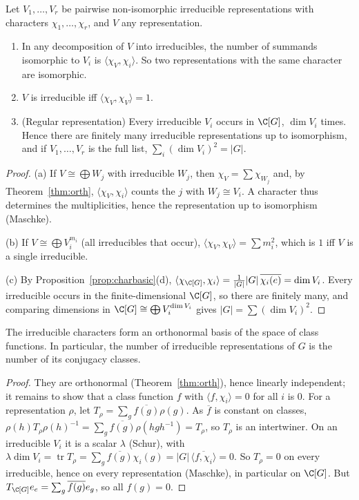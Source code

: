 \begin{corollary}\label{cor:mult}
Let $V_1,\dots,V_r$ be pairwise non-isomorphic irreducible representations with characters $\chi_1,\dots,\chi_r$, and $V$ any representation.
\begin{enumerate}[label=(\alph*)]
\item In any decomposition of $V$ into irreducibles, the number of summands isomorphic to $V_i$ is $\langle\chi_V,\chi_i\rangle$. So two representations with the same character are isomorphic.
\item $V$ is irreducible iff $\langle\chi_V,\chi_V\rangle=1$.
\item (Regular representation) Every irreducible $V_i$ occurs in $\C[G]$, $\dim V_i$ times. Hence there are finitely many irreducible representations up to isomorphism, and if $V_1,\dots,V_r$ is the full list, $\sum_i(\dim V_i)^2=|G|$.
\end{enumerate}
\end{corollary}
\begin{proof}
(a) If $V\cong\bigoplus W_j$ with irreducible $W_j$, then $\chi_V=\sum\chi_{W_j}$ and, by Theorem~\ref{thm:orth}, $\langle\chi_V,\chi_i\rangle$ counts the $j$ with $W_j\cong V_i$. A character thus determines the multiplicities, hence the representation up to isomorphism (Maschke).

(b) If $V\cong\bigoplus V_i^{m_i}$ (all irreducibles that occur), $\langle\chi_V,\chi_V\rangle=\sum m_i^2$, which is $1$ iff $V$ is a single irreducible.

(c) By Proposition~\ref{prop:charbasic}(d), $\langle\chi_{\C[G]},\chi_i\rangle=\frac1{|G|}|G|\,\overline{\chi_i(e)}=\dim V_i$. Every irreducible occurs in the finite-dimensional $\C[G]$, so there are finitely many, and comparing dimensions in $\C[G]\cong\bigoplus V_i^{\dim V_i}$ gives $|G|=\sum(\dim V_i)^2$.
\end{proof}

\begin{theorem}\label{thm:classes}
The irreducible characters form an orthonormal basis of the space of class functions. In particular, the number of irreducible representations of $G$ is the number of its conjugacy classes.
\end{theorem}
\begin{proof}
They are orthonormal (Theorem~\ref{thm:orth}), hence linearly independent; it remains to show that a class function $f$ with $\langle f,\chi_i\rangle=0$ for all $i$ is $0$. For a representation $\rho$, let $T_\rho=\sum_g\overline{f(g)}\rho(g)$. As $\overline f$ is constant on classes, $\rho(h)T_\rho\rho(h)^{-1}=\sum_g\overline{f(g)}\rho(hgh^{-1})=T_\rho$, so $T_\rho$ is an intertwiner. On an irreducible $V_i$ it is a scalar $\lambda$ (Schur), with $\lambda\dim V_i=\operatorname{tr}T_\rho=\sum_g\overline{f(g)}\chi_i(g)=|G|\,\overline{\langle f,\chi_i\rangle}=0$. So $T_\rho=0$ on every irreducible, hence on every representation (Maschke), in particular on $\C[G]$. But $T_{\C[G]}e_e=\sum_g\overline{f(g)}e_g$, so all $f(g)=0$.
\end{proof}

